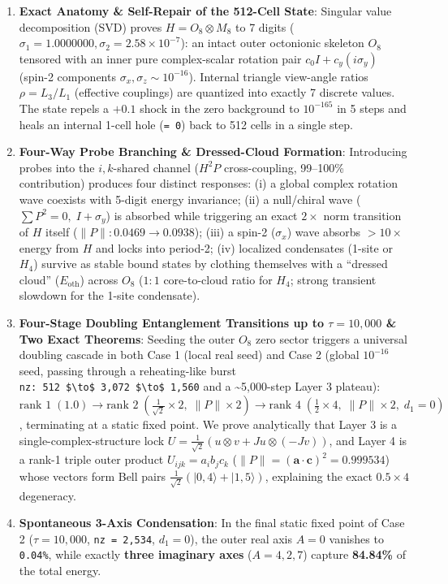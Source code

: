 \documentclass[
  a4paper,
]{article}
\providecommand{\tightlist}{%
  \setlength{\itemsep}{0pt}\setlength{\parskip}{0pt}}
\begin{document}
\begin{enumerate}
\def\labelenumi{\arabic{enumi}.}
\tightlist
\item
  \textbf{Exact Anatomy \& Self-Repair of the 512-Cell State}: Singular
  value decomposition (SVD) proves \(H = O_8 \otimes M_8\) to 7 digits
  (\(\sigma_1 = 1.0000000, \sigma_2 = 2.58\times 10^{-7}\)): an intact
  outer octonionic skeleton \(O_8\) tensored with an inner pure
  complex-scalar rotation pair \(c_0 I + c_y(i\sigma_y)\) (spin-2
  components \(\sigma_x, \sigma_z \sim 10^{-16}\)). Internal triangle
  view-angle ratios \(\rho = L_3/L_1\) (effective couplings) are
  quantized into exactly 7 discrete values. The state repels a \(+0.1\)
  shock in the zero background to \(10^{-165}\) in 5 steps and heals an
  internal 1-cell hole (\texttt{=\ 0}) back to 512 cells in a single
  step.
\item
  \textbf{Four-Way Probe Branching \& Dressed-Cloud Formation}:
  Introducing probes into the \(i,k\)-shared channel (\(H^2 P\)
  cross-coupling, 99--100\% contribution) produces four distinct
  responses: (i) a global complex rotation wave coexists with 5-digit
  energy invariance; (ii) a null/chiral wave
  (\(\sum P^2 = 0,\; I+\sigma_y\)) is absorbed while triggering an exact
  \(2\times\) norm transition of \(H\) itself
  (\(\|P\|: 0.0469 \to 0.0938\)); (iii) a spin-2 (\(\sigma_x\)) wave
  absorbs \(>10\times\) energy from \(H\) and locks into period-2; (iv)
  localized condensates (1-site or \(H_4\)) survive as stable bound
  states by clothing themselves with a ``dressed cloud''
  (\(E_{\mathrm{oth}}\)) across \(O_8\) (\(1:1\) core-to-cloud ratio for
  \(H_4\); strong transient slowdown for the 1-site condensate).
\item
  \textbf{Four-Stage Doubling Entanglement Transitions up to
  \(\tau = 10,000\) \& Two Exact Theorems}: Seeding the outer \(O_8\)
  zero sector triggers a universal doubling cascade in both Case 1
  (local real seed) and Case 2 (global \(10^{-16}\) seed, passing
  through a reheating-like burst
  \texttt{nz:\ 512\ \$\textbackslash{}to\$\ 3,072\ \$\textbackslash{}to\$\ 1,560}
  and a \textasciitilde5,000-step Layer 3 plateau):
  \(\text{rank } 1\;(1.0) \to \text{rank } 2\;(\frac{1}{\sqrt{2}}\times 2,\; \|P\|\times 2) \to \text{rank } 4\;(\frac{1}{2}\times 4,\; \|P\|\times 2,\; d_1 = 0)\),
  terminating at a static fixed point. We prove analytically that Layer
  3 is a single-complex-structure lock
  \(U = \frac{1}{\sqrt{2}}(u\otimes v + Ju\otimes(-Jv))\), and Layer 4
  is a rank-1 triple outer product \(U_{ijk} = a_i b_j c_k\)
  (\(\|P\| = (\mathbf{a}\cdot\mathbf{c})^2 = 0.999534\)) whose vectors
  form Bell pairs \(\frac{1}{\sqrt{2}}(|0,4\rangle + |1,5\rangle)\),
  explaining the exact \(0.5 \times 4\) degeneracy.
\item
  \textbf{Spontaneous 3-Axis Condensation}: In the final static fixed
  point of Case 2 (\(\tau = 10,000\), \texttt{nz\ =\ 2,534},
  \(d_1 = 0\)), the outer real axis \(A=0\) vanishes to \texttt{0.04\%},
  while exactly \textbf{three imaginary axes} (\(A = 4, 2, 7\)) capture
  \textbf{84.84\%} of the total energy.
\end{enumerate}
\end{document}
